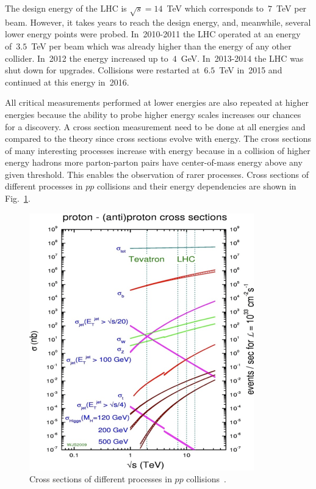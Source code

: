 


The design energy of the LHC is $\sqrt{s}=14$~TeV which corresponds to~$7$~TeV per beam. However, it takes years to reach the design energy, and, meanwhile, several lower energy points were probed. In~2010-2011 the LHC operated at an energy of~$3.5$~TeV per beam which was already higher than the energy of any other collider. In~2012 the energy increased up to~$4$~GeV. In~2013-2014 the LHC was shut down for upgrades. Collisions were restarted at~$6.5$~TeV in~2015 and continued at this energy in~2016. 

All critical measurements performed at lower energies are also repeated at higher energies because the ability to probe higher energy scales increases our chances for a discovery. A cross section measurement need to be done at all energies and compared to the theory since cross sections evolve with energy. The cross sections of many interesting processes increase with energy because in a collision of higher energy hadrons more parton-parton pairs have center-of-mass energy above any given threshold. This enables the observation of rarer processes. Cross sections of different processes in $pp$ collisions and their energy dependencies are shown in Fig.~\ref{fig:LHC_totalCS}.

\begin{figure}
  \centering
  \includegraphics[width=.65\linewidth]{../figs/Exp/LHC_totalCS.png}
  \caption{Cross sections of different processes in $pp$ collisions~\cite{ref_fig_LHC_totalCS}.}
  \label{fig:LHC_totalCS}
\end{figure}

